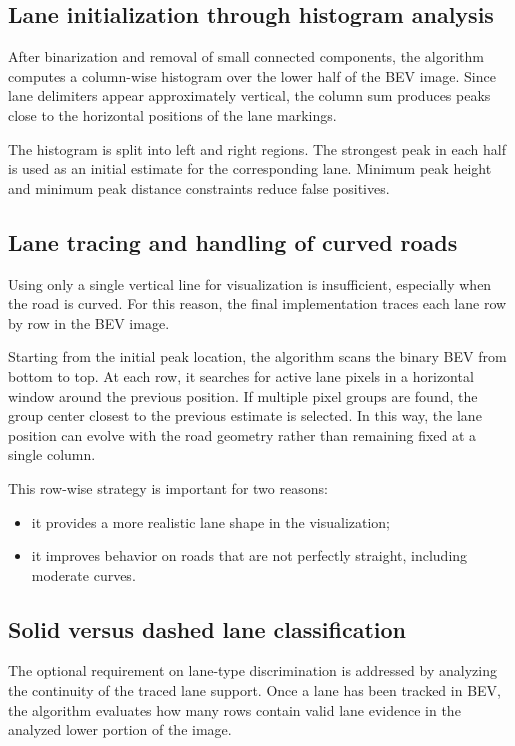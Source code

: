 \documentclass[conference]{IEEEtran}
\begin{document}
\subsection{Lane initialization through histogram analysis}
After binarization and removal of small connected components, the algorithm computes a column-wise histogram over the lower half of the BEV image. Since lane delimiters appear approximately vertical, the column sum produces peaks close to the horizontal positions of the lane markings.

The histogram is split into left and right regions. The strongest peak in each half is used as an initial estimate for the corresponding lane. Minimum peak height and minimum peak distance constraints reduce false positives.

\subsection{Lane tracing and handling of curved roads}
Using only a single vertical line for visualization is insufficient, especially when the road is curved. For this reason, the final implementation traces each lane row by row in the BEV image.

Starting from the initial peak location, the algorithm scans the binary BEV from bottom to top. At each row, it searches for active lane pixels in a horizontal window around the previous position. If multiple pixel groups are found, the group center closest to the previous estimate is selected. In this way, the lane position can evolve with the road geometry rather than remaining fixed at a single column.

This row-wise strategy is important for two reasons:
\begin{itemize}
    \item it provides a more realistic lane shape in the visualization;
    \item it improves behavior on roads that are not perfectly straight, including moderate curves.
\end{itemize}

\subsection{Solid versus dashed lane classification}
The optional requirement on lane-type discrimination is addressed by analyzing the continuity of the traced lane support. Once a lane has been tracked in BEV, the algorithm evaluates how many rows contain valid lane evidence in the analyzed lower portion of the image.
\end{document}
